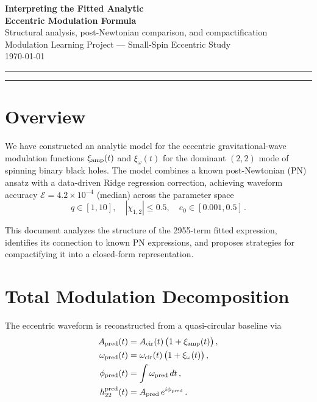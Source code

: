 \documentclass[11pt,letterpaper]{article}
\newcommand{\xamp}{\xi_{\rm amp}}
\newcommand{\xomg}{\xi_{\omega}}
\newcommand{\calE}{\mathcal{E}}
\begin{document}
\begin{center}
{\LARGE\bfseries Interpreting the Fitted Analytic\\[4pt] Eccentric Modulation Formula}\\[12pt]
{\large Structural analysis, post-Newtonian comparison, and compactification}\\[8pt]
{\normalsize Modulation Learning Project --- Small-Spin Eccentric Study}\\[4pt]
{\small\today}
\end{center}

\vspace{6pt}
\hrule
\vspace{12pt}

\tableofcontents
\vspace{12pt}
\hrule
\vspace{12pt}

\section{Overview}

We have constructed an analytic model for the eccentric gravitational-wave modulation functions $\xamp(t)$ and $\xomg(t)$ for the dominant $(2,2)$ mode of spinning binary black holes. The model combines a known post-Newtonian (PN) ansatz with a data-driven Ridge regression correction, achieving waveform accuracy $\calE = 4.2 \times 10^{-4}$ (median) across the parameter space
\begin{equation}
q \in [1,10], \quad |\chi_{1,2}| \leq 0.5, \quad e_0 \in [0.001, 0.5]\,.
\end{equation}

This document analyzes the structure of the 2955-term fitted expression, identifies its connection to known PN expressions, and proposes strategies for compactifying it into a closed-form representation.

\section{Total Modulation Decomposition}

The eccentric waveform is reconstructed from a quasi-circular baseline via
\begin{align}
A_{\rm pred}(t) &= A_{\rm cir}(t)\,\bigl(1 + \xamp(t)\bigr)\,, \label{eq:Apred}\\
\omega_{\rm pred}(t) &= \omega_{\rm cir}(t)\,\bigl(1 + \xomg(t)\bigr)\,, \label{eq:wpred}\\
\phi_{\rm pred}(t) &= \int \omega_{\rm pred}\,dt\,, \label{eq:phipred}\\
h_{22}^{\rm pred}(t) &= A_{\rm pred}\,e^{i\phi_{\rm pred}}\,. \label{eq:hpred}
\end{align}
\end{document}
